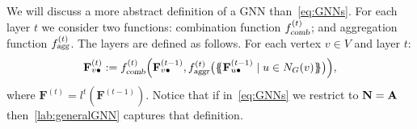 We will discuss a more abstract definition of a GNN than~\eqref{eq:GNNs}.
For each layer $t$ we consider two functions:
combination function $f_{\textsl{comb}}^{(t)}$; and aggregation function
$f_{\textsl{agg}}^{(t)}$. The layers are defined as follows. For each vertex $v\in V$ and layer $t$:
\begin{equation}
\mathbf{F}^{(t)}_{v\bullet}:=
f_{\textsl{comb}}^{(t)}\Bigl(
\mathbf{F}_{v\bullet}^{(t-1)},f_{\textsl{aggr}}^{(t)}\bigl(\{\!\!\{ \mathbf{F}^{(t-1)}_{u\bullet} \mathrel{\mid} u \in N_G(v) \}\!\!\}\bigr)
\Bigr), \label{lab:generalGNN}
\end{equation}
where $\mathbf{F}^{(t)} = l^{t}(\mathbf{F}^{(t-1)})$. Notice that if in~\eqref{eq:GNNs} we restrict to $\mathbf{N} = \mathbf{A}$ then~\eqref{lab:generalGNN} captures that definition.





